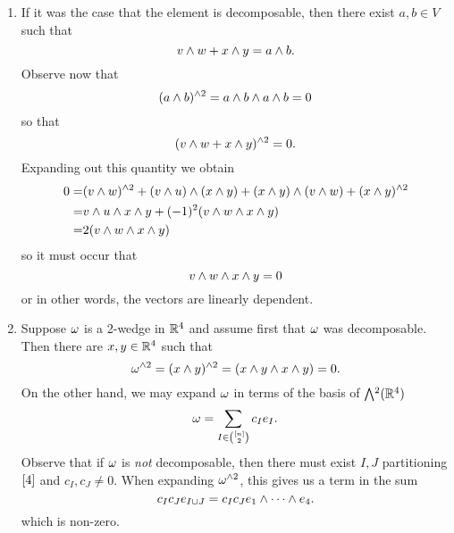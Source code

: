 \documentclass[12pt]{memoir}
\begin{document}
\begin{ptcbr}
    \begin{enumerate}
        \item If it was the case that the element is decomposable, then there exist $a,b\in V$ such that
        $$v\wedge w+x\wedge y=a\wedge b.$$
        Observe now that 
        $$(a\wedge b)^{\wedge 2}=a\wedge b\wedge a\wedge b=0$$
        so that 
        $$(v\wedge w+x\wedge y)^{\wedge 2}=0.$$
        Expanding out this quantity we obtain
        \begin{align*}
            0=&(v\wedge w)^{\wedge 2}+(v\wedge u)\wedge(x\wedge y)+(x\wedge y)\wedge(v\wedge w)+(x\wedge y)^{\wedge 2}\\
            =&v\wedge u\wedge x\wedge y+(-1)^2(v\wedge w\wedge x\wedge y)\\
            =&2(v\wedge w\wedge x\wedge y)
        \end{align*}
        so it must occur that 
        $$v\wedge w\wedge x\wedge y=0$$
        or in other words, the vectors are linearly dependent. 
        \item Suppose $\omega$ is a 2-wedge in $\mathbb{R}^4$ and assume first that $\omega$ was decomposable. Then there are $x,y\in\mathbb{R}^4$ such that 
        $$\omega^{\wedge 2}=(x\wedge y)^{\wedge 2}=(x\wedge y\wedge x\wedge y)=0.$$
        On the other hand, we may expand $\omega$ in terms of the basis of $\exterior^2(\bR^4)$ 
        $$\omega=\sum_{I\in\binom{\left\lbrack n\right\rbrack}{2}}c_{I}e_I.$$
        Observe that if $\omega$ is \emph{not} decomposable, then there must exist $I,J$ partitioning $\left\lbrack4\right\rbrack$ and $c_I,c_J\neq 0$. When expanding $\omega^{\wedge 2}$, this gives us a term in the sum 
        $$c_Ic_J e_{I\cup J}=c_Ic_J e_1\wedge\cdots\wedge e_4.$$
        which is non-zero. 
    \end{enumerate}
\end{ptcbr}
\end{document}
